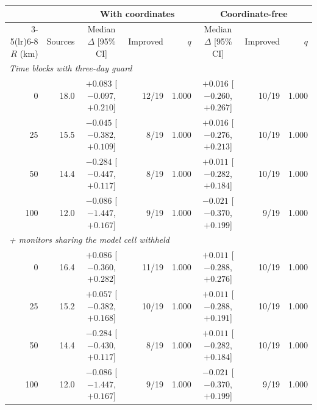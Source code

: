 \begin{tabular}{rrcrrcrr}\toprule
& & \multicolumn{3}{c}{With coordinates} & \multicolumn{3}{c}{Coordinate-free} \\ \cmidrule(lr){3-5}\cmidrule(lr){6-8}
$R$ (km) & Sources & Median $\Delta$ [95\% CI] & Improved & $q$ & Median $\Delta$ [95\% CI] & Improved & $q$ \\ \midrule
\multicolumn{8}{l}{\emph{Time blocks with three-day guard}} \\
0 & 18.0 & $+0.083$ [$-0.097$, $+0.210$] & 12/19 & 1.000 & $+0.016$ [$-0.260$, $+0.267$] & 10/19 & 1.000 \\
25 & 15.5 & $-0.045$ [$-0.382$, $+0.109$] & 8/19 & 1.000 & $+0.016$ [$-0.276$, $+0.213$] & 10/19 & 1.000 \\
50 & 14.4 & $-0.284$ [$-0.447$, $+0.117$] & 8/19 & 1.000 & $+0.011$ [$-0.282$, $+0.184$] & 10/19 & 1.000 \\
100 & 12.0 & $-0.086$ [$-1.447$, $+0.167$] & 9/19 & 1.000 & $-0.021$ [$-0.370$, $+0.199$] & 9/19 & 1.000 \\
\multicolumn{8}{l}{\emph{+ monitors sharing the model cell withheld}} \\
0 & 16.4 & $+0.086$ [$-0.360$, $+0.282$] & 11/19 & 1.000 & $+0.011$ [$-0.288$, $+0.276$] & 10/19 & 1.000 \\
25 & 15.2 & $+0.057$ [$-0.382$, $+0.168$] & 10/19 & 1.000 & $+0.011$ [$-0.288$, $+0.191$] & 10/19 & 1.000 \\
50 & 14.4 & $-0.284$ [$-0.430$, $+0.117$] & 8/19 & 1.000 & $+0.011$ [$-0.282$, $+0.184$] & 10/19 & 1.000 \\
100 & 12.0 & $-0.086$ [$-1.447$, $+0.167$] & 9/19 & 1.000 & $-0.021$ [$-0.370$, $+0.199$] & 9/19 & 1.000 \\
\bottomrule\end{tabular}

